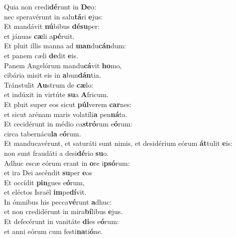 \evenverse Quia non credi\textbf{dé}runt in \textbf{De}o:~\*\\
\evenverse nec speravérunt in salu\textbf{tá}ri \textbf{e}jus:\\
\oddverse Et mandávit \textbf{nú}bibus \textbf{dé}\textbf{su}per:~\*\\
\oddverse et jánuas \textbf{cæ}li a\textbf{pé}ruit.\\
\evenverse Et pluit illis manna ad \textbf{man}du\textbf{cán}dum:~\*\\
\evenverse et panem cæli \textbf{de}dit \textbf{e}is.\\
\oddverse Panem Angelórum mandu\textbf{cá}vit \textbf{ho}mo,~\*\\
\oddverse cibária misit eis in \textbf{a}bun\textbf{dán}tia.\\
\evenverse Tránstulit \textbf{Au}strum de \textbf{cæ}lo:~\*\\
\evenverse et indúxit in virtúte \textbf{su}a \textbf{A}fricum.\\
\oddverse Et pluit super eos sicut \textbf{púl}verem \textbf{car}nes:~\*\\
\oddverse et sicut arénam maris volatíli\textbf{a} pen\textbf{ná}ta.\\
\evenverse Et cecidérunt in médio ca\textbf{stró}rum e\textbf{ó}rum:~\*\\
\evenverse circa tabernácu\textbf{la} e\textbf{ó}rum.\\
\oddverse Et manducavérunt, et saturáti sunt nimis, et desidérium eórum \textbf{át}tulit \textbf{e}is:~\*\\
\oddverse non sunt fraudáti a desi\textbf{dé}rio \textbf{su}o.\\
\evenverse Adhuc escæ eórum erant in \textbf{o}re i\textbf{psó}rum:~\*\\
\evenverse et ira Dei ascéndit \textbf{su}per \textbf{e}os\\
\oddverse Et occídit \textbf{pin}gues e\textbf{ó}rum,~\*\\
\oddverse et eléctos Israël \textbf{im}pe\textbf{dí}vit.\\
\evenverse In ómnibus his pecca\textbf{vé}runt \textbf{a}dhuc:~\*\\
\evenverse et non credidérunt in mira\textbf{bí}libus \textbf{e}jus.\\
\oddverse Et defecérunt in vanitáte \textbf{di}es e\textbf{ó}rum:~\*\\
\oddverse et anni eórum cum festi\textbf{na}ti\textbf{ó}ne.\\

